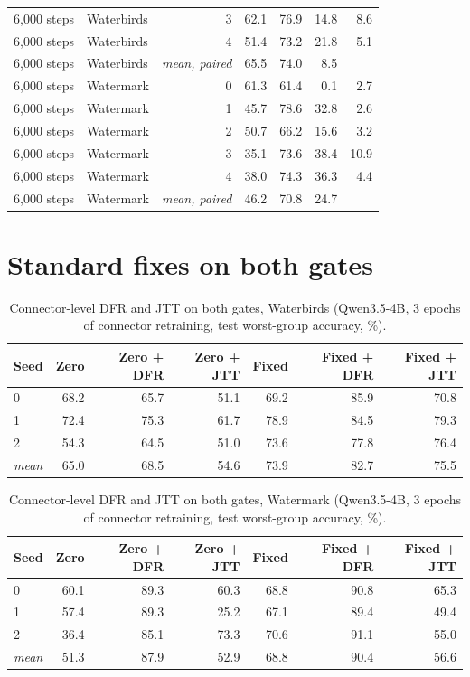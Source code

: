 \documentclass[10pt]{article}
\begin{document}
\begin{longtable}{llrrrrr}
6,000 steps & Waterbirds & 3 & 62.1 & 76.9 & 14.8 & 8.6 \\
6,000 steps & Waterbirds & 4 & 51.4 & 73.2 & 21.8 & 5.1 \\
6,000 steps & Waterbirds & \textit{mean, paired} & 65.5 & 74.0 & 8.5 &  \\
6,000 steps & Watermark & 0 & 61.3 & 61.4 & 0.1 & 2.7 \\
6,000 steps & Watermark & 1 & 45.7 & 78.6 & 32.8 & 2.6 \\
6,000 steps & Watermark & 2 & 50.7 & 66.2 & 15.6 & 3.2 \\
6,000 steps & Watermark & 3 & 35.1 & 73.6 & 38.4 & 10.9 \\
6,000 steps & Watermark & 4 & 38.0 & 74.3 & 36.3 & 4.4 \\
6,000 steps & Watermark & \textit{mean, paired} & 46.2 & 70.8 & 24.7 &  \\
\bottomrule
\end{longtable}

\section{Standard fixes on both gates}
\begin{longtable}{lrrrrrr}
\caption{Connector-level DFR and JTT on both gates, Waterbirds (Qwen3.5-4B, 3 epochs of connector retraining, test worst-group accuracy, \%).}\label{tab:s-dfr-water}\\
\toprule
Seed & Zero & Zero + DFR & Zero + JTT & Fixed & Fixed + DFR & Fixed + JTT \\ \midrule
\endhead
0 & 68.2 & 65.7 & 51.1 & 69.2 & 85.9 & 70.8 \\
1 & 72.4 & 75.3 & 61.7 & 78.9 & 84.5 & 79.3 \\
2 & 54.3 & 64.5 & 51.0 & 73.6 & 77.8 & 76.4 \\
\textit{mean} & 65.0 & 68.5 & 54.6 & 73.9 & 82.7 & 75.5 \\
\bottomrule
\end{longtable}

\begin{longtable}{lrrrrrr}
\caption{Connector-level DFR and JTT on both gates, Watermark (Qwen3.5-4B, 3 epochs of connector retraining, test worst-group accuracy, \%).}\label{tab:s-dfr-water}\\
\toprule
Seed & Zero & Zero + DFR & Zero + JTT & Fixed & Fixed + DFR & Fixed + JTT \\ \midrule
\endhead
0 & 60.1 & 89.3 & 60.3 & 68.8 & 90.8 & 65.3 \\
1 & 57.4 & 89.3 & 25.2 & 67.1 & 89.4 & 49.4 \\
2 & 36.4 & 85.1 & 73.3 & 70.6 & 91.1 & 55.0 \\
\textit{mean} & 51.3 & 87.9 & 52.9 & 68.8 & 90.4 & 56.6 \\
\bottomrule
\end{longtable}
\end{document}

